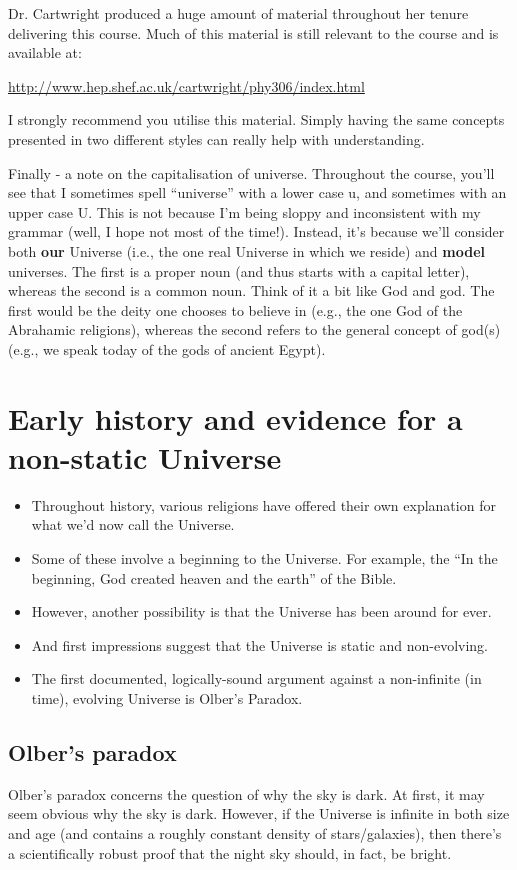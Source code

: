 \documentclass[11pt]{article}
\begin{document}
Dr. Cartwright produced a huge amount of material throughout her tenure delivering this course. Much of this material is still relevant to the course and is available at:

\noindent
\url{http://www.hep.shef.ac.uk/cartwright/phy306/index.html}

\noindent
I strongly recommend you utilise this material. Simply having the same concepts presented in two different styles can really help with understanding.

Finally - a note on the capitalisation of universe. Throughout the course, you'll see that I sometimes spell ``universe'' with a lower case u, and sometimes with an upper case U. This is not because I'm being sloppy and inconsistent with my grammar (well, I hope not most of the time!). Instead, it's because we'll consider both {\bf our} Universe (i.e., the one real Universe in which we reside) and {\bf model} universes. The first is a proper noun (and thus starts with a capital letter), whereas the second is a common noun. Think of it a bit like God and god. The first would be the deity one chooses to believe in (e.g., the one God of the Abrahamic religions), whereas the second refers to the general concept of god(s) (e.g., we speak today of the gods of ancient Egypt).

\section{Early history and evidence for a non-static Universe}
\begin{itemize}
\item Throughout history, various religions have offered their own explanation for what we'd now call the Universe.
\item Some of these involve a beginning to the Universe. For example, the ``In the beginning, God created heaven and the earth'' of the Bible.
\item However, another possibility is that the Universe has been around for ever.
\item And first impressions suggest that the Universe is static and non-evolving.
\item The first documented, logically-sound argument against a non-infinite (in time), evolving Universe is Olber's Paradox.
\end{itemize}


\subsection{Olber's paradox}
Olber's paradox concerns the question of why the sky is dark. At
first, it may seem obvious why the sky is dark. However, if the
Universe is infinite in both size and age (and contains a roughly
constant density of stars/galaxies), then there's a scientifically robust proof that the night sky should, in fact, be bright.
\end{document}
